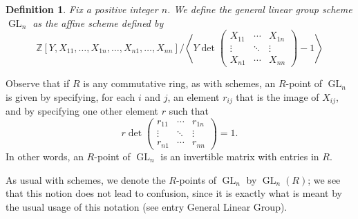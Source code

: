 \documentclass[12pt]{article}
\newtheorem{defn}{Definition}
\DeclareMathOperator{\GL}{GL}
\begin{document}
\begin{defn}
Fix a positive integer $n$.  We define the \emph{general linear group scheme} $\GL_n$ as the affine scheme defined by
\[
{\mathbb{Z}[Y,X_{11},\ldots,X_{1n},\ldots,X_{n1},\ldots,X_{nn}]}
/
{\left<Y\det\begin{pmatrix}
X_{11}&\cdots&X_{1n}\\
\vdots&\ddots&\vdots\\
X_{n1}&\cdots&X_{nn}
\end{pmatrix}-1\right>}
\]
\end{defn}

Observe that if $R$ is any commutative ring, as  with schemes, an $R$-point of $\GL_n$ is given by specifying, for each $i$ and $j$, an element $r_{ij}$ that is the image of $X_{ij}$, and by specifying one other element $r$ such that
\[
r\det\begin{pmatrix}
r_{11}&\cdots&r_{1n}\\
\vdots&\ddots&\vdots\\
r_{n1}&\cdots&r_{nn}
\end{pmatrix} = 1.
\]
In other words, an $R$-point of $\GL_n$ is an invertible matrix with entries in $R$. 

As usual with schemes, we denote the $R$-points of $\GL_n$ by $\GL_n(R)$; we see that this notion does not lead to confusion, since it is exactly what is meant by the usual usage of this notation (see entry General Linear Group).
\end{document}
